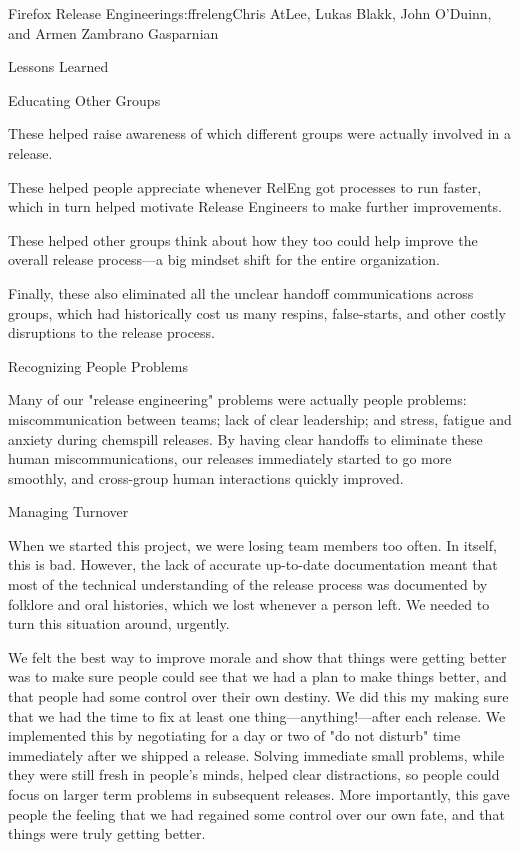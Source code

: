 \begin{aosachapter}{Firefox Release Engineering}{s:ffreleng}{Chris AtLee, Lukas Blakk, John O'Duinn, and Armen Zambrano Gasparnian}
\begin{aosasect1}{Lessons Learned}
\begin{aosasect2}{Educating Other Groups}
\begin{aosaitemize}
\item These helped raise awareness of which different groups were actually
involved in a release.
\item These helped people appreciate whenever RelEng got processes to run
faster, which in turn helped motivate Release Engineers to make further
improvements.
\item These helped other groups think about how they too could help improve the
overall release process---a big mindset shift for the entire organization.
\item Finally, these also eliminated all the unclear handoff communications
across groups, which had historically cost us many respins, false-starts, and
other costly disruptions to the release process.
\end{aosaitemize}

\end{aosasect2}

\begin{aosasect2}{Recognizing People Problems}

Many of our "release engineering" problems were actually people problems:
miscommunication between teams; lack of clear leadership; and stress, fatigue
and anxiety during chemspill releases. By having clear handoffs to eliminate
these human miscommunications, our releases immediately started to go more
smoothly, and cross-group human interactions quickly improved.

\end{aosasect2}

\begin{aosasect2}{Managing Turnover}

When we started this project, we were losing team members too often. In itself,
this is bad. However, the lack of accurate up-to-date documentation meant that
most of the technical understanding of the release process was documented by
folklore and oral histories, which we lost whenever a person left. We needed to
turn this situation around, urgently.

We felt the best way to improve morale and show that things were getting better
was to make sure people could see that we had a plan to make things better, and
that people had some control over their own destiny. We did this my making sure
that we had the time to fix at least one thing---anything!---after each
release. We implemented this by negotiating for a day or two of "do not disturb"
time immediately after we shipped a release. Solving immediate small problems,
while they were still fresh in people's minds, helped clear distractions, so
people could focus on larger term problems in subsequent releases. More
importantly, this gave people the feeling that we had regained some control
over our own fate, and that things were truly getting better.


\end{aosasect2}
\end{aosasect1}
\end{aosachapter}
